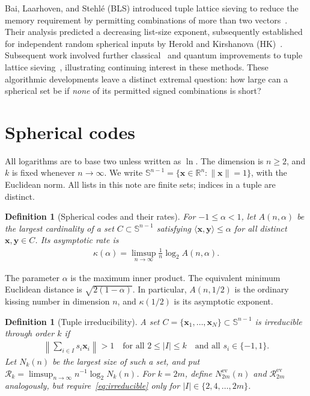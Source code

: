 \documentclass[pdflatex,sn-mathphys-num]{sn-jnl}
\theoremstyle{thmstyleone}
\theoremstyle{thmstyletwo}
\newtheorem{definition}[theorem]{Definition}
\newcommand{\Rrate}{\mathcal{R}}
\newcommand{\vx}{\mathbf{x}}
\newcommand{\vy}{\mathbf{y}}
\newcommand{\sph}{\mathbb S}
\newcommand{\RR}{\mathbb R}
\newcommand{\norm}[1]{\lVert#1\rVert}
\newcommand{\ev}{\mathrm{ev}}
\begin{document}
Bai, Laarhoven, and Stehl\'e (BLS) introduced tuple lattice sieving to reduce the memory requirement by permitting combinations of more than two vectors~\cite{BLS16}. Their analysis predicted a decreasing list-size exponent, subsequently established for independent random spherical inputs by Herold and Kirshanova (HK)~\cite{HK17}. Subsequent work involved further classical~\cite{HKL18} and quantum improvements to tuple lattice sieving~\cite{KMPR19, ECG26}, illustrating continuing interest in these methods. These algorithmic developments leave a distinct extremal question: how large can a spherical set be if \emph{none} of its permitted signed combinations is short?


\section{Spherical codes}
\label{sec:spherical}

All logarithms are to base two unless written as $\ln$. The dimension is $n\ge2$, and $k$ is fixed whenever $n\to\infty$. We write $\sph^{n-1}=\{\vx\in\RR^n:\norm{\vx}=1\}$, with the Euclidean norm. All lists in this note are finite sets; indices in a tuple are distinct.

\begin{samepage}
\begin{definition}[Spherical codes and their rates]
\label{def:codes}
For $-1\le\alpha<1$, let $A(n,\alpha)$ be the largest cardinality of a set $C\subset\sph^{n-1}$ satisfying $\langle\vx,\vy\rangle\le\alpha$ for all distinct $\vx,\vy\in C$. Its asymptotic rate is
\begin{align}\label{eq:kappa}
 \kappa(\alpha)=\limsup_{n\to\infty}\frac1n\log_2 A(n,\alpha).
\end{align}
\end{definition}
\end{samepage}

The parameter $\alpha$ is the maximum inner product. The equivalent minimum Euclidean distance is $\sqrt{2(1-\alpha)}$. In particular, $A(n,1/2)$ is the ordinary kissing number in dimension $n$, and $\kappa(1/2)$ is its asymptotic exponent.

\begin{definition}[Tuple irreducibility]
\label{def:tuple}
A set $C=\{\vx_1,\ldots,\vx_N\}\subset\sph^{n-1}$ is \emph{irreducible
through order $k$} if
\begin{align}\label{eq:irreducible}
 \left\|\sum_{i\in I}s_i \vx_i\right\|>1
 \quad\text{for all }2\le |I|\le k
 \quad\text{and all }s_i\in\{-1,1\}.
\end{align}
Let $N_k(n)$ be the largest size of such a set, and put
$\Rrate_k=\limsup_{n\to\infty}n^{-1}\log_2 N_k(n)$.
For $k=2m$, define $N^{\ev}_{2m}(n)$ and $\Rrate^{\ev}_{2m}$ analogously,
but require~\eqref{eq:irreducible} only for $|I|\in\{2,4,\ldots,2m\}$.
\end{definition}
\end{document}
